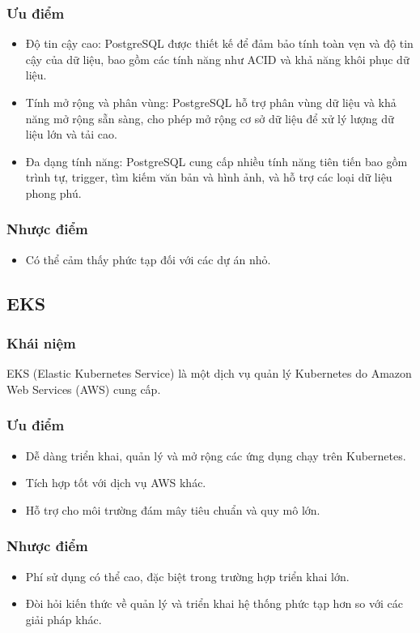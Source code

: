 \subsubsection{Ưu điểm}
\begin{itemize}
    \item Độ tin cậy cao: PostgreSQL được thiết kế để đảm bảo tính toàn vẹn và độ tin cậy của dữ liệu, bao gồm các tính năng như ACID và khả năng khôi phục dữ liệu.
    \item Tính mở rộng và phân vùng: PostgreSQL hỗ trợ phân vùng dữ liệu và khả năng mở rộng sẵn sàng, cho phép mở rộng cơ sở dữ liệu để xử lý lượng dữ liệu lớn và tải cao.
    \item Đa dạng tính năng: PostgreSQL cung cấp nhiều tính năng tiên tiến bao gồm trình tự, trigger, tìm kiếm văn bản và hình ảnh, và hỗ trợ các loại dữ liệu phong phú.
\end{itemize}
\subsubsection{Nhược điểm}
\begin{itemize}
    \item Có thể cảm thấy phức tạp đối với các dự án nhỏ.
\end{itemize}
\subsection{EKS}
\subsubsection{Khái niệm}
\indent EKS (Elastic Kubernetes Service) là một dịch vụ quản lý Kubernetes do Amazon Web Services (AWS) cung cấp.
\subsubsection{Ưu điểm}
\begin{itemize}
    \item Dễ dàng triển khai, quản lý và mở rộng các ứng dụng chạy trên Kubernetes.
    \item Tích hợp tốt với dịch vụ AWS khác.
    \item Hỗ trợ cho môi trường đám mây tiêu chuẩn và quy mô lớn.
\end{itemize}
\subsubsection{Nhược điểm}
\begin{itemize}
    \item Phí sử dụng có thể cao, đặc biệt trong trường hợp triển khai lớn.
    \item Đòi hỏi kiến thức về quản lý và triển khai hệ thống phức tạp hơn so với các giải pháp khác.
\end{itemize}
